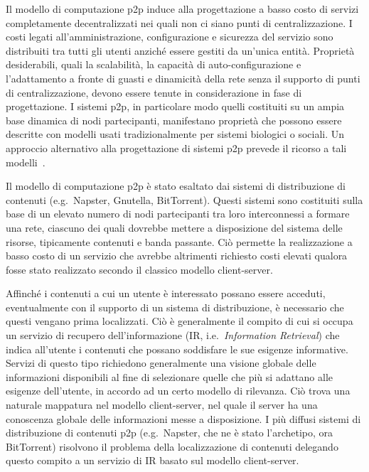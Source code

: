 Il modello di computazione p2p induce alla progettazione a basso costo di servizi completamente decentralizzati nei quali non ci siano punti di centralizzazione. I costi legati all'amministrazione, configurazione e sicurezza del servizio sono distribuiti tra tutti gli utenti anziché essere gestiti da un'unica entità. Proprietà desiderabili, quali la scalabilità, la capacità di auto-configurazione e l'adattamento a fronte di guasti e dinamicità della rete senza il supporto di punti di centralizzazione, devono essere tenute in considerazione in fase di progettazione. I sistemi p2p, in particolare modo quelli costituiti su un ampia base dinamica di nodi partecipanti, manifestano proprietà che possono essere descritte con modelli usati tradizionalmente per sistemi biologici o sociali. Un approccio alternativo alla progettazione di sistemi p2p prevede il ricorso a tali modelli~\cite{MH08}.

Il modello di computazione p2p è stato esaltato dai sistemi di distribuzione di contenuti (e.g.\ Napster, Gnutella, BitTorrent). Questi sistemi sono costituiti sulla base di un elevato numero di nodi partecipanti tra loro interconnessi a formare una rete, ciascuno dei quali dovrebbe mettere a disposizione del sistema delle risorse, tipicamente contenuti e banda passante. Ciò permette la realizzazione a basso costo di un servizio che avrebbe altrimenti richiesto costi elevati qualora fosse stato realizzato secondo il classico modello client-server.

Affinché i contenuti a cui un utente è interessato possano essere acceduti, eventualmente con il supporto di un sistema di distribuzione, è necessario che questi vengano prima localizzati. Ciò è generalmente il compito di cui si occupa un servizio di recupero dell'informazione (IR, i.e.\ \textit{Information Retrieval}) che indica all'utente i contenuti che possano soddisfare le sue esigenze informative. Servizi di questo tipo richiedono generalmente una visione globale delle informazioni disponibili al fine di selezionare quelle che più si adattano alle esigenze dell'utente, in accordo ad un certo modello di rilevanza. Ciò trova una naturale mappatura nel modello client-server, nel quale il server ha una conoscenza globale delle informazioni messe a disposizione. I più diffusi sistemi di distribuzione di contenuti p2p (e.g.\ Napster, che ne è stato l'archetipo, ora BitTorrent) risolvono il problema della localizzazione di contenuti delegando questo compito a un servizio di IR basato sul modello client-server.

